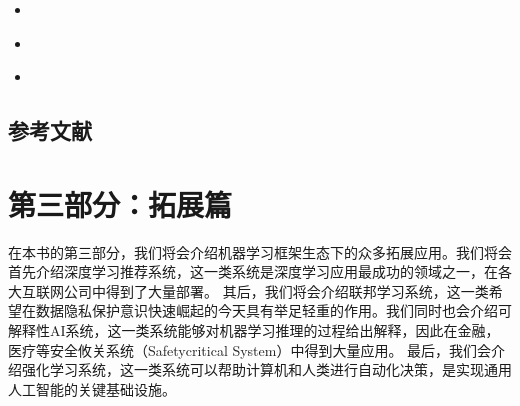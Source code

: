 \documentclass[letterpaper,10pt,english]{sphinxmanual}
\begin{document}
\begin{itemize}
\begin{itemize}
\item {} 
\sphinxAtStartPar
{}%
\begin{footnote}[57]\sphinxAtStartFootnote
{}
%
\end{footnote}

\item {} 
\sphinxAtStartPar
{}%
\begin{footnote}[58]\sphinxAtStartFootnote
{}
%
\end{footnote}

\item {} 
\sphinxAtStartPar
{}%
\begin{footnote}[59]\sphinxAtStartFootnote
{}
%
\end{footnote}

\end{itemize}

\end{itemize}


\section{参考文献}
\label{\detokenize{chapter_distributed_training/summary:id3}}
\sphinxAtStartPar



\chapter{第三部分：拓展篇}
\label{\detokenize{chapter_preface_extension/index:id1}}\label{\detokenize{chapter_preface_extension/index::doc}}
\sphinxAtStartPar
在本书的第三部分，我们将会介绍机器学习框架生态下的众多拓展应用。我们将会首先介绍深度学习推荐系统，这一类系统是深度学习应用最成功的领域之一，在各大互联网公司中得到了大量部署。
其后，我们将会介绍联邦学习系统，这一类希望在数据隐私保护意识快速崛起的今天具有举足轻重的作用。我们同时也会介绍可解释性AI系统，这一类系统能够对机器学习推理的过程给出解释，因此在金融，医疗等安全攸关系统（Safety\sphinxhyphen{}critical
System）中得到大量应用。
最后，我们会介绍强化学习系统，这一类系统可以帮助计算机和人类进行自动化决策，是实现通用人工智能的关键基础设施。
\end{document}
